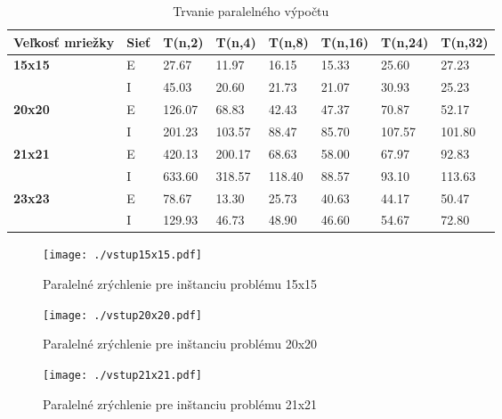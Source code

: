 \documentclass[slovak]{article}
\begin{document}
	\begin{table}\centering
		\begin{tabularx}{\textwidth}{|X|X|X|X|X|X|X|X|}
			\hline                        
			\textbf{Veľkosť mriežky} & \textbf{Sieť} & \textbf{T(n,2)} & \textbf{T(n,4)} & \textbf{T(n,8)} & \textbf{T(n,16)} & \textbf{T(n,24)} & \textbf{T(n,32)} \\ \hline
			\multirow{2}{*}{\textbf{15x15}} & E 	& 27.67 & 11.97 & 16.15 & 15.33 & 25.60 & 27.23 \\ \cline{2-8}
			\textbf & I & 45.03 & 20.60 & 21.73 & 21.07 & 30.93 & 25.23  \\ \hline
			\multirow{2}{*}{\textbf{20x20}} & E 	& 126.07 & 68.83 & 42.43 & 47.37 & 70.87 & 52.17 \\ \cline{2-8}
			\textbf & I & 201.23 & 103.57 & 88.47 & 85.70 & 107.57 & 101.80  \\ \hline
			\multirow{2}{*}{\textbf{21x21}} & E 	& 420.13 & 200.17 & 68.63 & 58.00 & 67.97 & 92.83  \\ \cline{2-8}
			\textbf & I & 633.60 & 318.57 & 118.40 & 88.57 & 93.10 & 113.63  \\ \hline
			\multirow{2}{*}{\textbf{23x23}} & E 	& 78.67 & 13.30 & 25.73 & 40.63 & 44.17 & 50.47  \\ \cline{2-8}
			\textbf & I & 129.93 & 46.73 & 48.90 & 46.60 & 54.67 & 72.80  \\ \hline
		\end{tabularx}
	\caption{Trvanie paralelného výpočtu}
	\label{tab:par}
	\end{table}
	
	\begin{figure}[!h]\centering
	\texttt{[image: ./vstup15x15.pdf]}
	\caption{Paralelné zrýchlenie pre inštanciu problému 15x15}\label{fig:vstup15}
	\end{figure}

	\begin{figure}[!h]\centering
	\texttt{[image: ./vstup20x20.pdf]}
	\caption{Paralelné zrýchlenie pre inštanciu problému 20x20}\label{fig:vstup20}
	\end{figure}
	
	\begin{figure}[!h]\centering
	\texttt{[image: ./vstup21x21.pdf]}
	\caption{Paralelné zrýchlenie pre inštanciu problému 21x21}\label{fig:vstup21}
	\end{figure}	
\end{document}
